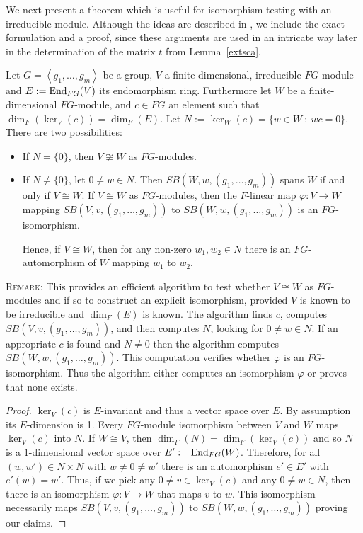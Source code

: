 We next present a theorem which is useful for isomorphism testing with
an irreducible module. Although the ideas are described in
\cite[Section 6]{MeatAxeRP}, we include the exact formulation and a proof,
since these arguments are used in an intricate way later in the
determination of the matrix $t$ from Lemma~\ref{extsca}.

\begin{Theo}
\label{isotest}
Let $G=\left< g_1, \ldots, g_m\right>$ be a group, $V$ a finite-dimensional,
irreducible $FG$-module and 
$E := \End_{FG}(V)$ its endomorphism ring. Furthermore let 
$W$ be a finite-dimensional $FG$-module, 
and
$c \in FG$ an element such that $\dim_F(\ker_V(c)) = \dim_F(E)$. 
Let $N := \ker_W(c) = \{w \in W \ : \ wc = 0\}$. There are two possibilities:

\begin{itemize}
\item If $N = \{0\}$, then $V \not\cong W$ as $FG$-modules. 

\item If $N \neq \{0\}$,  let $0 \neq w \in N$. 
Then $SB(W,w,(g_1, \ldots, g_m))$ spans $W$ if and only if 
$V \cong W$. If $V \cong W$ as $FG$-modules, then the $F$-linear
map $\varphi : V \to W$ mapping $SB(V,v,(g_1, \ldots, g_m))$ to
$SB(W,w,(g_1, \ldots, g_m))$ is an $FG$-isomorphism.

Hence, if $V \cong W$, then for any non-zero $w_1, w_2 \in N$ there is an 
$FG$-automorphism of $W$ mapping $w_1$ to $w_2$.
\end{itemize}
\end{Theo}

\noindent\textsc{Remark:} 
This provides an efficient algorithm to test
whether $V \cong W$ as $FG$-modules and if so to construct an explicit
isomorphism, provided $V$ is known to be irreducible and $\dim_F(E)$ is known.
 The algorithm finds $c$, 
computes $SB(V,v,(g_1, \ldots, g_m))$, and then computes
$N$, looking for $0 \neq w \in N$. 
If an appropriate $c$ is found and $N \neq 0$ then the algorithm computes
$SB(W,w,(g_1, \ldots, g_m))$. This computation verifies
whether $\varphi$ is an $FG$-isomorphism. Thus the algorithm
either computes an isomorphism $\varphi$ or proves that none exists.

\smallskip
\begin{proof}
$\ker_V(c)$ is $E$-invariant and thus
a vector space over $E$. By assumption its $E$-dimension is 1. 
Every $FG$-module isomorphism between $V$ and $W$ maps
$\ker_V(c)$ into $N$. If $W \cong V$, then
$\dim_F(N) = \dim_F(\ker_V(c))$ and so $N$ is a $1$-dimensional
vector space over $E' := \End_{FG}(W)$. Therefore, for all
$(w,w') \in N \times N$ with $w \neq 0 \neq w'$ there is an
automorphism $e' \in E'$ with $e'(w)=w'$. Thus, if we pick
any $0 \neq v \in \ker_V(c)$ and any $0 \neq w \in N$, then there
is an isomorphism $\varphi : V \to W$ that maps $v$ to $w$. This
isomorphism necessarily maps $SB(V,v,(g_1, \ldots, g_m))$ to
$SB(W,w,(g_1,\ldots,g_m))$ proving our claims.
\end{proof}

